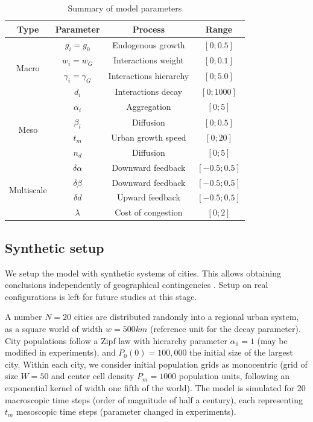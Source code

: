 \documentclass[referee,lineno,pdflatex,sn-apa]{sn-jnl}
\begin{document}
\begin{table}[h]
	\caption{Summary of model parameters\label{tab:parameters}}
	\centering
	\begin{tabular}{|c|c|c|c|}
	\hline
		Type & Parameter & Process & Range \\\hline
		\multirow{4}{*}{Macro} & $g_i = g_0$ & Endogenous growth & $\left[0 ; 0.5\right]$ \\
		& $w_i = w_G$ & Interactions weight & $\left[0 ; 0.1\right]$ \\
		& $\gamma_i = \gamma_G$ & Interactions hierarchy & $\left[0 ; 5.0\right]$ \\
		& $d_i$ & Interactions decay & $\left[0 ; 1000\right]$ \\ \hline
		\multirow{4}{*}{Meso} & $\alpha_i$ & Aggregation & $\left[0 ; 5\right]$ \\
		& $\beta_i$ & Diffusion & $\left[0 ; 0.5\right]$ \\
		& $t_m$ & Urban growth speed & $\left[0 ; 20\right]$ \\
		& $n_d$ & Diffusion & $\left[0 ; 5\right]$ \\ \hline
		\multirow{4}{*}{Multiscale} & $\delta\alpha$ & Downward feedback & $\left[-0.5 ; 0.5\right]$ \\
		& $\delta\beta$ & Downward feedback & $\left[-0.5 ; 0.5\right]$ \\
		& $\delta d$ & Upward feedback & $\left[-0.5 ; 0.5\right]$ \\
		& $\lambda$ & Cost of congestion & $\left[0 ; 2\right]$ \\\hline
	\end{tabular}
\end{table}



\subsection{Synthetic setup}

We setup the model with synthetic systems of cities. This allows obtaining conclusions independently of geographical contingencies \cite{raimbault2019space}. Setup on real configurations is left for future studies at this stage.

A number $N=20$ cities are distributed randomly into a regional urban system, as a square world of width $w=500km$ (reference unit for the decay parameter). City populations follow a Zipf law with hierarchy parameter $\alpha_0 = 1$ (may be modified in experiments), and $P_0 (0) = 100,000$ the initial size of the largest city. Within each city, we consider initial population grids as monocentric (grid of size $W=50$ and center cell density $P_m = 1000$ population units, following an exponential kernel of width one fifth of the world). The model is simulated for 20 macroscopic time steps (order of magnitude of half a century), each representing $t_m$ mesoscopic time steps (parameter changed in experiments).
\end{document}
